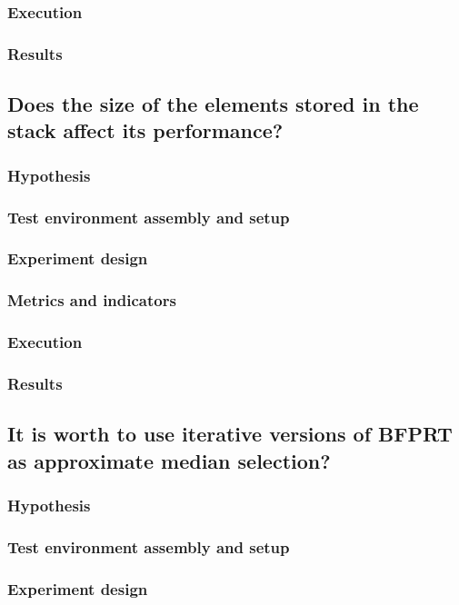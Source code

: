 \documentclass{iccmemoria}
\begin{document}
\subsubsection{Execution}
\subsubsection{Results}

\subsection{Does the size of the elements stored in the stack affect its performance?}
\subsubsection{Hypothesis}
\subsubsection{Test environment assembly and setup}
\subsubsection{Experiment design}
\subsubsection{Metrics and indicators}
\subsubsection{Execution}
\subsubsection{Results}

\subsection{It is worth to use iterative versions of BFPRT as approximate median selection?}
\subsubsection{Hypothesis}
\subsubsection{Test environment assembly and setup}
\subsubsection{Experiment design}
\end{document}
